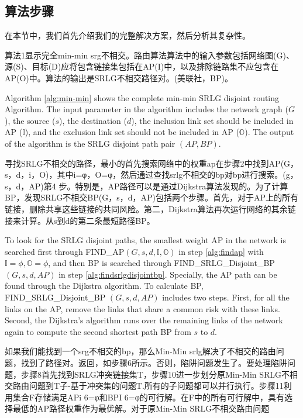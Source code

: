 
\subsection{算法步骤}
在本节中，我们首先介绍我们的完整解决方案，然后分析其复杂性。

算法1显示完全min-min srg不相交。路由算法算法中的输入参数包括网络图(G)、源(S)、目标(D)应将包含链接集包括在AP(I)中，以及排除链路集不应包含在AP(O)中。算法的输出是SRLG不相交路径对。(美联社，BP)。

Algorithm \ref{alg:min-min} shows the complete min-min SRLG disjoint routing Algorithm. The input parameter in the algorithm includes  the network graph ($G$), the source ($s$), the destination  ($d$), the inclusion link set should be included in AP ($\mathbb{I}$), and the exclusion link set should not be included in AP ($\mathbb{O}$). The output of the algorithm is the SRLG disjoint path pair $(AP,BP)$.


寻找SRLG不相交的路径，最小的首先搜索网络中的权重ap在步骤2中找到AP(G，s，d，i，O)，其中i=φ，O=φ，然后通过查找srlg不相交的bp对bp进行搜索。(g，s，d，AP)第4 步。特别是，AP路径可以是通过Dijkstra算法发现的。为了计算BP，发现SRLG不相交BP(G，s，d，AP)包括两个步骤。首先，对于AP上的所有链接，删除共享这些链接的共同风险。第二，Dijkstra算法再次运行网络的其余链接来计算。从s到d的第二条最短路径BP。


To look for the SRLG disjoint paths, the smallest weight AP in the network is searched  first through FIND\_AP$(G,s,d, \mathbb{I},\mathbb{O})$ in step \ref{alg:findap} with $\mathbb{I}=\phi,\mathbb{O}=\phi$, and then BP is searched through  FIND\_SRLG\_Disjoint\_BP
$(G,s,d,AP)$ in step \ref{alg:findsrlgdisjointbp}. Specially, the AP path can be found through the Dijkstra algorithm. To calculate BP, FIND\_SRLG\_Disjoint\_BP
$(G,s,d,AP)$ includes two steps. First, for all the links on the AP, remove the links that share a common risk with these links. Second, the Dijkstra's algorithm runs over the remaining links of the network again to compute the second shortest path BP from $s$ to $d$.


如果我们能找到一个srg不相交的bp，那么Min-Min srlg解决了不相交的路由问题，找到了路径对。返回，如步骤6所示。否则，陷阱问题发生了。要处理陷阱问题，步骤8首先找到SRLG冲突链接集T，步骤10进一步划分原Min-Min SRLG不相交路由问题到T子-基于冲突集的问题T.所有的子问题都可以并行执行。步骤11利用集合F存储满足APi 6=φ和BPI 6=φ的可行解。在F中的所有可行解中，具有选择最低的AP路径权重作为最优解。对于原Min-Min SRLG不相交路由问题


